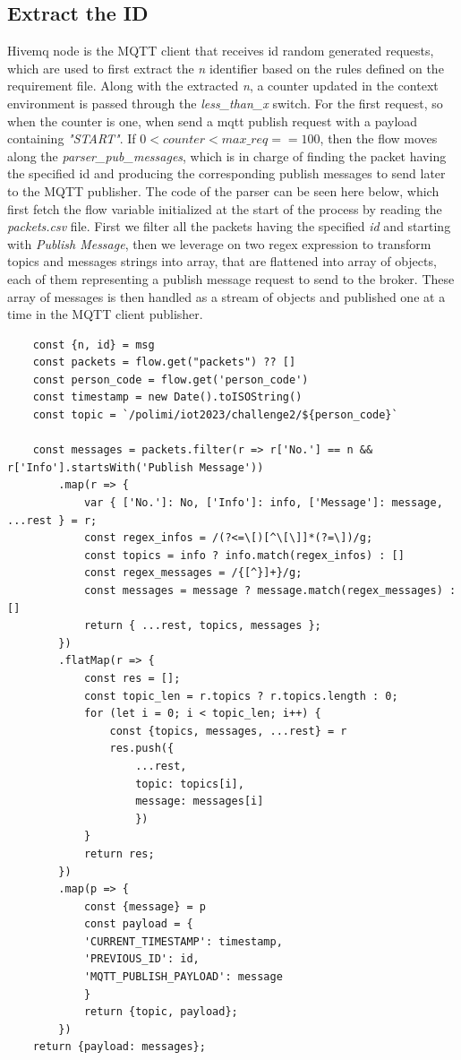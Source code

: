 \documentclass[12pt,a4paper]{article}
\begin{document}
\subsection*{Extract the ID}
Hivemq node is the MQTT client that receives id random generated requests, which are used to first extract the \textit{n} identifier based on the rules defined
on the requirement file. Along with the extracted \textit{n}, a counter updated in the context environment is passed through the \textit{less\_than\_x} switch.
For the first request, so when the counter is one, when send a mqtt publish request with a payload containing \textit{"START"}.
If $0 < counter < max\_req == 100$, then the flow moves along the \textit{parser\_pub\_messages}, which is in charge of
finding the packet having the specified id and producing the corresponding publish messages to send later to the MQTT publisher.
The code of the parser can be seen here below, which first fetch the flow variable initialized at the start of the process by
reading the \textit{packets.csv} file. 
First we filter all the packets having the specified \textit{id} and starting with \textit{Publish Message}, then 
we leverage on two regex expression to transform topics and messages strings into array, that are flattened
into array of objects, each of them representing a publish message request to send to the broker.
These array of messages is then handled as a stream of objects and published one at a time in the MQTT client publisher.
\begin{verbatim}
    const {n, id} = msg
    const packets = flow.get("packets") ?? []
    const person_code = flow.get('person_code')
    const timestamp = new Date().toISOString()
    const topic = `/polimi/iot2023/challenge2/${person_code}`

    const messages = packets.filter(r => r['No.'] == n && r['Info'].startsWith('Publish Message'))
        .map(r => {
            var { ['No.']: No, ['Info']: info, ['Message']: message, ...rest } = r;
            const regex_infos = /(?<=\[)[^\[\]]*(?=\])/g;
            const topics = info ? info.match(regex_infos) : []
            const regex_messages = /{[^}]+}/g;
            const messages = message ? message.match(regex_messages) : []
            return { ...rest, topics, messages };
        })
        .flatMap(r => {
            const res = [];
            const topic_len = r.topics ? r.topics.length : 0;
            for (let i = 0; i < topic_len; i++) {
                const {topics, messages, ...rest} = r
                res.push({ 
                    ...rest,
                    topic: topics[i], 
                    message: messages[i]
                    })
            }
            return res;
        })
        .map(p => {
            const {message} = p
            const payload = {
            'CURRENT_TIMESTAMP': timestamp,
            'PREVIOUS_ID': id,
            'MQTT_PUBLISH_PAYLOAD': message
            }
            return {topic, payload};
        })
    return {payload: messages};
\end{verbatim}
\end{document}
